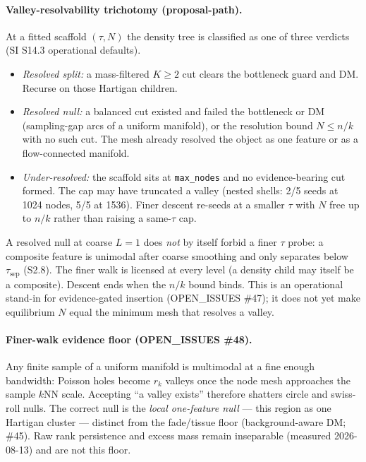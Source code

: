 \documentclass[11pt]{article}
\begin{document}
\paragraph{Valley-resolvability trichotomy (proposal-path).}
At a fitted scaffold $(\tau,N)$ the density tree is classified as one of
three verdicts (SI S14.3 operational defaults).
\begin{itemize}[leftmargin=1.5em]
  \item \emph{Resolved split:} a mass-filtered $K\ge 2$ cut clears the
    bottleneck guard and DM. Recurse on those Hartigan children.
  \item \emph{Resolved null:} a balanced cut existed and failed the
    bottleneck or DM (sampling-gap arcs of a uniform manifold), or the
    resolution bound $N\le n/k$ with no such cut. The mesh already
    resolved the object as one feature or as a flow-connected manifold.
  \item \emph{Under-resolved:} the scaffold sits at \texttt{max\_nodes}
    and no evidence-bearing cut formed. The cap may have truncated a
    valley (nested shells: 2/5 seeds at 1024 nodes, 5/5 at 1536). Finer
    descent re-seeds at a smaller $\tau$ with $N$ free up to $n/k$
    rather than raising a same-$\tau$ cap.
\end{itemize}
A resolved null at coarse $L{=}1$ does \emph{not} by itself forbid a finer
$\tau$ probe: a composite feature is unimodal after
coarse smoothing and only separates below $\tau_{\mathrm{sep}}$ (S2.8).
The finer walk is licensed at every level (a density child may itself
be a composite). Descent ends when the $n/k$ bound binds. This is an operational
stand-in for evidence-gated insertion (OPEN\_ISSUES \#47); it does not yet
make equilibrium $N$ equal the minimum mesh that resolves a valley.

\paragraph{Finer-walk evidence floor (OPEN\_ISSUES \#48).}
Any finite sample of a uniform manifold is multimodal at a fine enough
bandwidth: Poisson holes become $r_k$ valleys once the node mesh
approaches the sample $k$NN scale. Accepting ``a valley exists''
therefore shatters circle and swiss-roll nulls. The correct null is the
\emph{local one-feature null} --- this region as one Hartigan cluster
--- distinct from the fade/tissue floor (background-aware DM; \#45).
Raw rank persistence and excess mass remain inseparable (measured
2026-08-13) and are not this floor.
\end{document}
